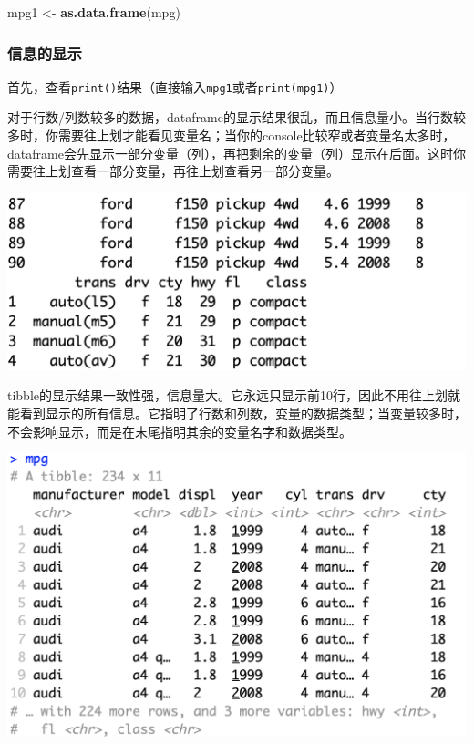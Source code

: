 \documentclass[]{book}
\newenvironment{Shaded}{\begin{snugshade}}{\end{snugshade}}
\newcommand{\KeywordTok}[1]{\textcolor[rgb]{0.13,0.29,0.53}{\textbf{#1}}}
\newcommand{\NormalTok}[1]{#1}
\newcommand{\StringTok}[1]{\textcolor[rgb]{0.31,0.60,0.02}{#1}}
\begin{document}
\begin{Shaded}
\begin{Highlighting}[]
\NormalTok{mpg1 <-}\StringTok{ }\KeywordTok{as.data.frame}\NormalTok{(mpg)}
\end{Highlighting}
\end{Shaded}

\hypertarget{tibble-df-diff-view}{%
\subsubsection{信息的显示}\label{tibble-df-diff-view}}

首先，查看\texttt{print()}结果（直接输入\texttt{mpg1}或者\texttt{print(mpg1)}）

对于行数/列数较多的数据，dataframe的显示结果很乱，而且信息量小。当行数较多时，你需要往上划才能看见变量名；当你的console比较窄或者变量名太多时，dataframe会先显示一部分变量（列），再把剩余的变量（列）显示在后面。这时你需要往上划查看一部分变量，再往上划查看另一部分变量。

\includegraphics[width=1\linewidth]{img/tibble/collapse}

tibble的显示结果一致性强，信息量大。它永远只显示前10行，因此不用往上划就能看到显示的所有信息。它指明了行数和列数，变量的数据类型；当变量较多时，不会影响显示，而是在末尾指明其余的变量名字和数据类型。

\includegraphics[width=1\linewidth]{img/tibble/tibble_print}
\end{document}
